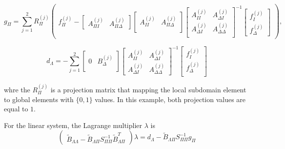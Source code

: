 \begin{equation}
g_{\Pi} = \sum_{j = 1}^{2} R_{\Pi}^{(j)} \begin{pmatrix}
f_{\Pi}^{(j)} - \begin{bmatrix}
A_{\Pi I}^{(j)} & A_{\Pi \Delta}^{(j)}
\end{bmatrix} \begin{bmatrix}
A_{II}^{(j)} & A_{\Pi \Delta}^{(j)} \\
\end{bmatrix} \begin{bmatrix}
A_{II}^{(j)} & A_{\Delta I}^{(j)} \\
A_{\Delta I}^{(j)} & A_{\Delta \Delta}^{(j)}\\
\end{bmatrix}^{-1} \begin{bmatrix}
f_{I}^{(j)} \\ f_{\Delta}^{(j)}
\end{bmatrix}
\end{pmatrix} ,
\end{equation}

\begin{equation}
d_{\Lambda} = - \sum_{j = 1}^{2} \begin{bmatrix}
0 & B_{\Delta}^{(j)} \\
\end{bmatrix} \begin{bmatrix}
A_{II}^{(j)} & A_{\Delta I}^{(j)} \\
A_{\Delta I}^{(j)} & A_{\Delta \Delta}^{(j)} 
\end{bmatrix}^{-1} \begin{bmatrix}
f_{I}^{(j)} \\ f_{\Delta}^{(j)} \\
\end{bmatrix}
\end{equation}

whre the $ R_{\Pi}^{(j)} $ is a projection matrix that mapping the local subdomain element to global elements with $ \{0, 1\} $ values. In this example, both projection values are equal to $ 1 $.

For the linear system, the Lagrange multiplier $ \lambda $ is
\begin{equation}
\begin{pmatrix}
\tilde{B}_{\Lambda \Lambda} - \tilde{B}_{\Lambda \Pi} S_{\Pi \Pi}^{-1} \tilde{B}_{\Lambda \Pi}^{T}
\end{pmatrix} \lambda = d_{\Lambda} - \tilde{B}_{\Lambda \Pi} S_{\Pi \Pi}^{-1} g_{\Pi}
\end{equation}


